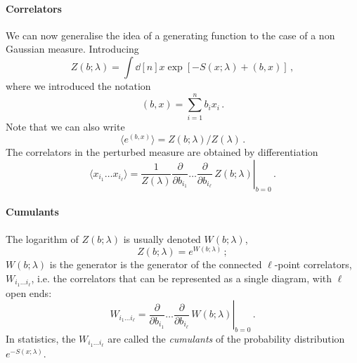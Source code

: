\documentclass[notes.tex]{subfiles}
\begin{document}
\paragraph{Correlators}

We can now generalise the idea of a generating function to the case of
a non Gaussian measure. Introducing
\begin{equation}
  \label{eq:GenFunctPert}
  Z(b;\lambda) = \int \dd[n]{x} \exp\left[
    -S(x;\lambda) + (b,x)
    \right]\, ,
\end{equation}
where we introduced the notation
\begin{equation}
  \label{eq:ScalProd}
  (b,x) = \sum_{i=1}^n b_i x_i\, .
\end{equation}
Note that we can also write
\begin{equation}
  \label{eq:GenFunctPertTwo}
  \langle e^{(b,x)} \rangle = Z(b;\lambda)/Z(\lambda)\, .
\end{equation}
The correlators in the perturbed measure are obtained by
differentiation
\begin{equation}
  \label{eq:CorrGenPert}
  \langle x_{i_1} \ldots x_{i_\ell}\rangle = \frac{1}{Z(\lambda)} \left.
  \frac{\partial}{\partial b_{i_1}} \ldots \frac{\partial}{\partial b_{i_\ell}}\,
  Z(b;\lambda)
\right|_{b=0} \, .
\end{equation}

\paragraph{Cumulants}

The logarithm of $Z(b;\lambda)$ is usually denoted $W(b;\lambda)$, 
\begin{equation}
  \label{eq:WGenDef}
  Z(b;\lambda) = e^{W(b;\lambda)}\, ;
\end{equation}
$W(b;\lambda)$ is the generator is the generator of the connected
$\ell$-point correlators, $W_{i_1 \ldots i_\ell}$, i.e. the correlators that can be represented as a single
diagram, with $\ell$ open ends:
\begin{equation}
  \label{eq:DiffWGen}
  W_{i_1 \ldots i_\ell} = \left.
  \frac{\partial}{\partial b_{i_1}} \ldots \frac{\partial}{\partial b_{i_\ell}}\,
  W(b;\lambda)
\right|_{b=0} \, .
\end{equation}
In statistics, the $W_{i_1 \ldots i_\ell}$ are called the {\em
  cumulants} of the probability distribution $e^{-S(x;\lambda)}$.
\end{document}
